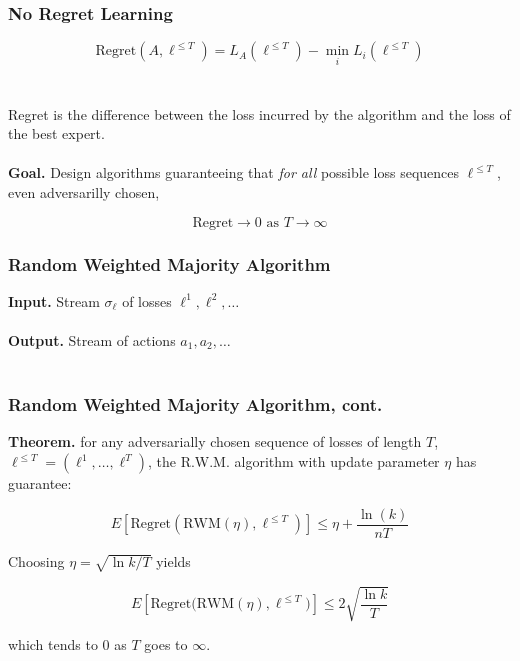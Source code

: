 \documentclass[aspectratio=169]{beamer}
\begin{document}
\begin{frame}
\frametitle{No Regret Learning}

$$\text{Regret}(A, \ell^{\leq T}) = L_A(\ell^{\leq T}) - \min_i L_i (\ell^{\leq T})$$\\~\\

Regret is the difference between the loss incurred by the algorithm and the loss of the best expert.\\~\\

\textbf{Goal.} Design algorithms guaranteeing that \emph{for all} possible loss sequences $\ell^{\leq T}$, even adversarilly chosen,

$$\text{Regret} \rightarrow 0 \text{ as } T\rightarrow \infty$$
\end{frame}

\begin{frame}
\frametitle{Random Weighted Majority Algorithm}

\textbf{Input.} Stream $\sigma_{\ell}$ of losses $\ell^1, \ell^2, \dots$\\~\\

\textbf{Output.} Stream of actions $a_1, a_2, \dots$\\~\\

\begin{algorithm}[H]
\begin{algorithmic}
  \EndFor
  \EndFor
  \EndProcedure
\end{algorithmic}
\end{algorithm}
\end{frame}

\begin{frame}
\frametitle{Random Weighted Majority Algorithm, cont.}

\textbf{Theorem.} for any adversarially chosen sequence of losses of length $T$, $\ell^{\leq T} = (\ell^1, \dots, \ell^T)$, the R.W.M. algorithm with update parameter $\eta$ has guarantee:

$$E[\text{Regret}(\text{RWM}(\eta), \ell^{\leq T})] \leq \eta + \frac{\ln(k)}{nT}$$

Choosing $\eta = \sqrt{\ln k/T}$ yields

$$E[\text{Regret(RWM}(\eta), \ell^{\leq T})] \leq 2\sqrt{\frac{\ln k}{T}}$$

which tends to $0$ as $T$ goes to $\infty$.
\end{frame}
\end{document}
